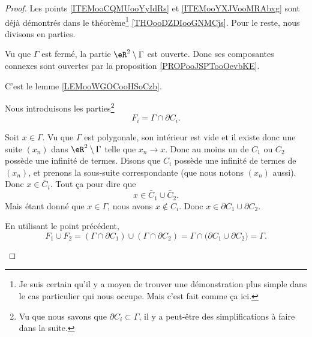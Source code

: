 \begin{proof}
	Les points \ref{ITEMooCQMUooYyIdRs} et \ref{ITEMooYXJVooMRAbxg} sont déjà démontrés dans le théorème\footnote{Je suis certain qu'il y a moyen de trouver une démonstration plus simple dans le cas particulier qui nous occupe. Mais c'est fait comme ça ici.} \ref{THOooDZDIooGNMCjs}. Pour le reste, nous divisons en parties.
	\begin{subproof}
		Vu que \( \Gamma\) est fermé, la partie \( \eR^2\setminus \Gamma\) est ouverte. Donc ses composantes connexes sont ouvertes par la proposition \ref{PROPooJSPTooOevbKE}.

				\label{ITEMooIRSEooYhRdnE}
		C'est le lemme \ref{LEMooWGOCooHSoCzb}.

		Nous introduisons les parties\footnote{Vu que nous savons que \( \partial C_i\subset \Gamma\), il y a peut-être des simplifications à faire dans la suite.}
		\begin{equation}
			F_i=\Gamma\cap \partial C_i.
		\end{equation}

		Soit \( x\in \Gamma\). Vu que \( \Gamma\) est polygonale, son intérieur est vide et il existe donc une suite \( (x_n)\) dans \( \eR^2\setminus \Gamma\) telle que \( x_n\to x\). Donc au moins un de \( C_1\) ou \( C_2\) possède une infinité de termes. Disons que \( C_i\) possède une infinité de termes de \( (x_n)\), et prenons la sous-suite correspondante (que nous notons \( (x_n)\) aussi). Donc \( x\in\bar C_i\). Tout ça pour dire que
		\begin{equation}
			x\in\bar C_1\cup \bar C_2.
		\end{equation}
		Mais étant donné que \( x\in \Gamma\), nous avons \( x\not\in C_i\). Donc \( x\in\partial C_1\cup\partial C_2\).

		\spitem[\( F_1\cup F_2=\Gamma\)]
		En utilisant le point précédent,
		\begin{equation}
			F_1\cup F_2=(\Gamma\cap\partial C_1)\cup(\Gamma\cap \partial C_2)=\Gamma\cap\big( \partial C_1\cup \partial C_2 \big)=\Gamma.
		\end{equation}


\end{subproof}
\end{proof}
